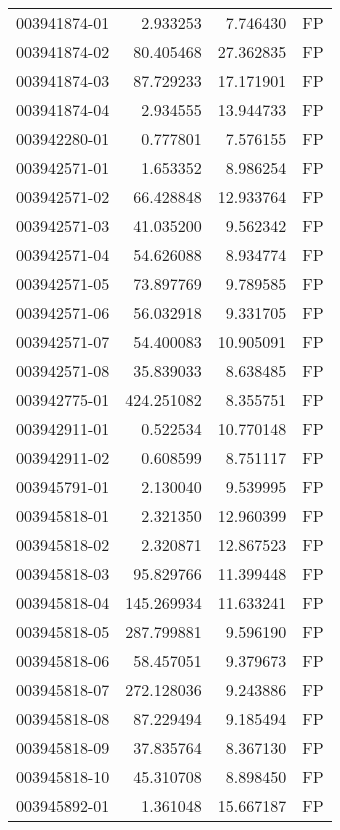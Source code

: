 \begin{tabular}{lrrl}
003941874-01 &    2.933253 &       7.746430 &   FP \\
003941874-02 &   80.405468 &      27.362835 &   FP \\
003941874-03 &   87.729233 &      17.171901 &   FP \\
003941874-04 &    2.934555 &      13.944733 &   FP \\
003942280-01 &    0.777801 &       7.576155 &   FP \\
003942571-01 &    1.653352 &       8.986254 &   FP \\
003942571-02 &   66.428848 &      12.933764 &   FP \\
003942571-03 &   41.035200 &       9.562342 &   FP \\
003942571-04 &   54.626088 &       8.934774 &   FP \\
003942571-05 &   73.897769 &       9.789585 &   FP \\
003942571-06 &   56.032918 &       9.331705 &   FP \\
003942571-07 &   54.400083 &      10.905091 &   FP \\
003942571-08 &   35.839033 &       8.638485 &   FP \\
003942775-01 &  424.251082 &       8.355751 &   FP \\
003942911-01 &    0.522534 &      10.770148 &   FP \\
003942911-02 &    0.608599 &       8.751117 &   FP \\
003945791-01 &    2.130040 &       9.539995 &   FP \\
003945818-01 &    2.321350 &      12.960399 &   FP \\
003945818-02 &    2.320871 &      12.867523 &   FP \\
003945818-03 &   95.829766 &      11.399448 &   FP \\
003945818-04 &  145.269934 &      11.633241 &   FP \\
003945818-05 &  287.799881 &       9.596190 &   FP \\
003945818-06 &   58.457051 &       9.379673 &   FP \\
003945818-07 &  272.128036 &       9.243886 &   FP \\
003945818-08 &   87.229494 &       9.185494 &   FP \\
003945818-09 &   37.835764 &       8.367130 &   FP \\
003945818-10 &   45.310708 &       8.898450 &   FP \\
003945892-01 &    1.361048 &      15.667187 &   FP \\

\end{tabular}
